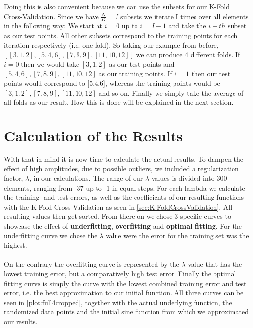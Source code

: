 \documentclass{article}
\begin{document}
	Doing this is also convenient because we can use the subsets for our K-Fold Cross-Validation. Since we have $\frac{N}{K} = I$ subsets we iterate I times over all elements in the following way: We start at $i = 0$ up to $i = I-1$ and take the $i-th$ subset as our test points. All other subsets correspond to the training points for each iteration respectively (i.e. one fold). So taking our example from before, $[[3,1,2],[5,4,6],[7,8,9],[11,10,12]]$ we can produce 4 different folds. If $i = 0$ then we would take $[3,1,2]$ as our test points and $[5,4,6],[7,8,9],[11,10,12]$ as our training points. If $i = 1$ then our test points would correspond to [5,4,6], whereas the training points would be $[3,1,2],[7,8,9],[11,10,12]$ and so on. Finally we simply take the average of all folds as our result. How this is done will be explained in the next section. 
	
	
	\section{Calculation of the Results}
	\label{sec:CalculateTheResults}
	With that in mind it is now time to calculate the actual results. To dampen the effect of high amplitudes, due to possible outliers, we included a regularization factor, $\lambda$, in our calculations. The range of our $\lambda$ values is divided into 300 elements, ranging from -37 up to -1 in equal steps. For each lambda we calculate the training- and test errors, as well as the coefficients of our resulting functions with the K-Fold Cross Validation as seen in \autoref{sec:K-FoldCrossValidation}. All resulting values then get sorted. From there on we chose 3 specific curves to showcase the effect of \textbf{underfitting}, \textbf{overfitting} and \textbf{optimal fitting}. For the underfitting curve we chose the $\lambda$ value were the error for the training set was the highest. \\
	\\	
	On the contrary the overfitting curve is represented by the $\lambda$ value that has the lowest training error, but a comparatively high test error. Finally the optimal fitting curve is simply the curve with the lowest combined training error and test error, i.e. the best approximation to our initial function. All three curves can be seen in \autoref{plot:full4cropped}, together with the actual underlying function, the randomized data points and the initial sine function from which we approximated our results.  
	
\end{document}
